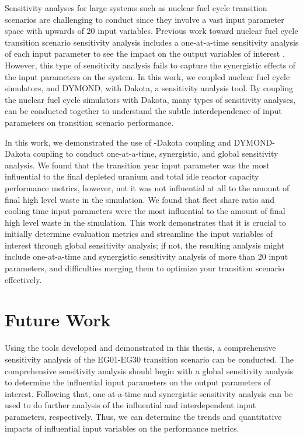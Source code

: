 Sensitivity analyses for large systems such as nuclear 
fuel cycle transition scenarios are challenging to conduct 
since they involve a vast input parameter space with
upwards of 20 input variables. 
Previous work toward nuclear fuel cycle transition scenario sensitivity analysis 
includes a one-at-a-time sensitivity analysis of each input parameter 
to see the impact on the output variables of interest \cite{noauthor_effects_2017}.
However, this type of sensitivity analysis fails to capture the 
synergistic effects of the input parameters on the system.  
In this work, we coupled nuclear fuel cycle simulators, \Cyclus and 
DYMOND, with Dakota, a sensitivity analysis tool. 
By coupling the nuclear fuel cycle simulators with Dakota, 
many types of sensitivity analyses, 
can be conducted together to understand the subtle
interdependence of input parameters on transition scenario
performance. 

In this work, we demonstrated the use of \Cyclus-Dakota coupling 
and DYMOND-Dakota coupling to conduct one-at-a-time, synergistic, and 
global sensitivity analysis. 
We found that the transition year input parameter was the most influential
to the final depleted uranium and total idle reactor capacity performance 
metrics, however, not it was not influential at all to the amount of final high 
level waste in the simulation. 
We found that fleet share ratio and cooling time input parameters 
were the most influential to the amount of final high 
level waste in the simulation. 
This work demonstrates that it is crucial to initially determine evaluation metrics and 
streamline the input variables of interest through global sensitivity 
analysis; if not, the resulting analysis might include one-at-a-time and 
synergistic sensitivity analysis of more than 20 input parameters, 
and difficulties merging them to optimize your transition scenario 
effectively.

\section{Future Work}
Using the tools developed and demonstrated in this thesis, a comprehensive 
sensitivity analysis of the EG01-EG30 transition scenario can be conducted. 
The comprehensive sensitivity analysis should begin with a global
sensitivity analysis to determine the influential input parameters 
on the output parameters of interest. 
Following that, one-at-a-time and synergistic sensitivity analysis can be used to do 
further analysis of the influential and interdependent input parameters, respectively. 
Thus, we can determine the trends and quantitative impacts of influential input 
variables on the performance metrics.  
